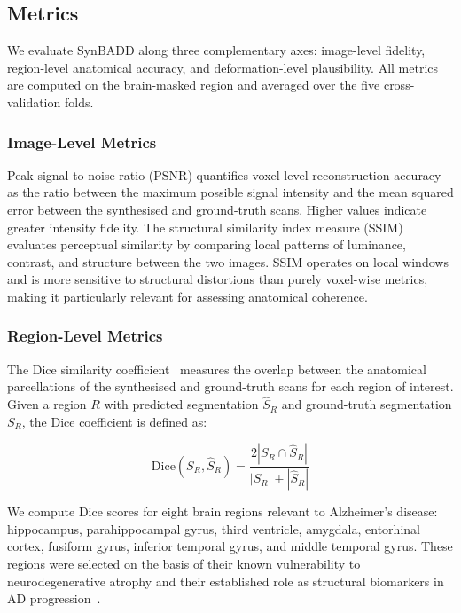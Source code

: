 \subsection{Metrics}
\label{sec:metrics}

We evaluate SynBADD along three complementary axes: image-level fidelity, region-level anatomical accuracy, and deformation-level plausibility. All metrics are computed on the brain-masked region and averaged over the five cross-validation folds.

\subsubsection*{Image-Level Metrics}

Peak signal-to-noise ratio (PSNR) quantifies voxel-level reconstruction accuracy as the ratio between the maximum possible signal intensity and the mean squared error between the synthesised and ground-truth scans. Higher values indicate greater intensity fidelity. The structural similarity index measure (SSIM)~\cite{wang2004ssim} evaluates perceptual similarity by comparing local patterns of luminance, contrast, and structure between the two images. SSIM operates on local windows and is more sensitive to structural distortions than purely voxel-wise metrics, making it particularly relevant for assessing anatomical coherence.

\subsubsection*{Region-Level Metrics}

The Dice similarity coefficient~\cite{dice1945} measures the overlap between the anatomical parcellations of the synthesised and ground-truth scans for each region of interest. Given a region $R$ with predicted segmentation $\hat{S}_R$ and ground-truth segmentation $S_R$, the Dice coefficient is defined as:

\begin{equation}
\text{Dice}(S_R, \hat{S}_R) = \frac{2 |S_R \cap \hat{S}_R|}{|S_R| + |\hat{S}_R|}
\end{equation}

We compute Dice scores for eight brain regions relevant to Alzheimer's disease: hippocampus, parahippocampal gyrus, third ventricle, amygdala, entorhinal cortex, fusiform gyrus, inferior temporal gyrus, and middle temporal gyrus. These regions were selected on the basis of their known vulnerability to neurodegenerative atrophy and their established role as structural biomarkers in AD progression~\cite{braak1991neuropathological,jack2018nia,barnes2009atrophy}.

